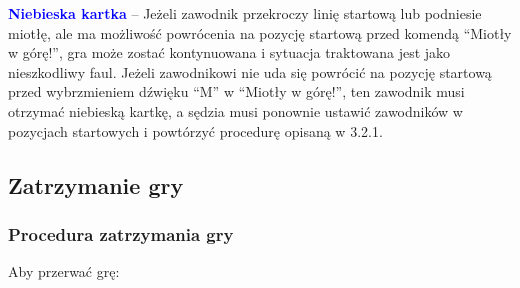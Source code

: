 \documentclass[12pt]{article}
\newcommand\bluecard[1]{\bgroup\textcolor{blue}{\textbf{#1}}}
\begin{document}
\bluecard{Niebieska kartka} -- Jeżeli zawodnik przekroczy linię startową lub
podniesie miotłę, ale ma możliwość powrócenia na pozycję startową przed
komendą ``Miotły w górę!'', gra może zostać kontynuowana i sytuacja
traktowana jest jako nieszkodliwy faul. Jeżeli zawodnikowi nie uda się
powrócić na pozycję startową przed wybrzmieniem dźwięku ``M'' w ``Miotły
w górę!'', ten zawodnik musi otrzymać niebieską kartkę, a sędzia musi
ponownie ustawić zawodników w pozycjach startowych i powtórzyć procedurę
opisaną w 3.2.1.

\subsection{Zatrzymanie gry}

\subsubsection{Procedura zatrzymania gry}
Aby przerwać grę:
\end{document}
